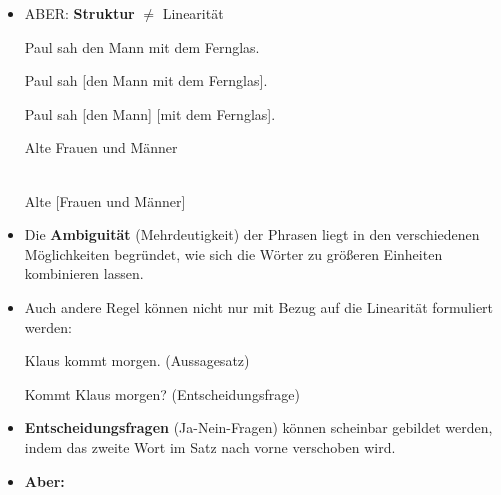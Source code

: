 \begin{frame}

\begin{itemize}
	\item ABER: \textbf{Struktur} $\neq$ Linearität
	
	\ea Paul sah den Mann mit dem Fernglas.

\pause 
	
		\ea Paul sah [den Mann mit dem Fernglas].\\ 
		\vs 
		
		\ex Paul sah [den 	Mann] [mit dem 	Fernglas].
		\z
	\z 

\pause 
	
	\ea Alte Frauen und Männer

\pause 
	
		\\
		\vs
		\ex Alte [Frauen und Männer]
		\z
	\z 

\pause 

	\item Die \textbf{Ambiguität} (Mehrdeutigkeit) der Phrasen liegt in den verschiedenen Möglichkeiten begründet, wie sich die Wörter zu größeren Einheiten kombinieren lassen.

\end{itemize}

\end{frame}


\begin{frame}

\begin{itemize}
	\item Auch andere Regel können nicht nur mit Bezug auf die Linearität formuliert werden:
	
	\ea Klaus kommt morgen. \hfill (Aussagesatz)
	\z

	\ea Kommt Klaus morgen? \hfill (Entscheidungsfrage)
	\z
	
	\item \textbf{Entscheidungsfragen} (Ja-Nein-Fragen) können scheinbar gebildet werden, indem das zweite Wort im Satz nach vorne verschoben wird.\\

\pause
	
	\item[] \textbf{Aber:}
	
	\z
	
	\z
	
\end{itemize}

\end{frame}



